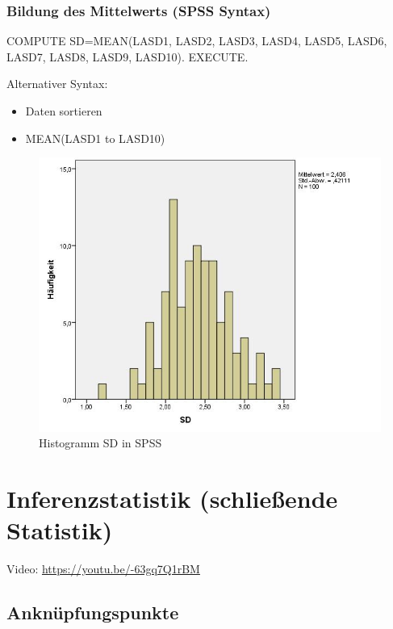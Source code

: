 \documentclass[
]{book}
\providecommand{\tightlist}{%
  \setlength{\itemsep}{0pt}\setlength{\parskip}{0pt}}
\begin{document}
\hypertarget{bildung-des-mittelwerts-spss-syntax}{%
\subsection{Bildung des Mittelwerts (SPSS Syntax)}\label{bildung-des-mittelwerts-spss-syntax}}

COMPUTE SD=MEAN(LASD1, LASD2, LASD3, LASD4, LASD5, LASD6, LASD7, LASD8, LASD9, LASD10).
EXECUTE.

Alternativer Syntax:

\begin{itemize}
\tightlist
\item
  Daten sortieren
\item
  MEAN(LASD1 to LASD10)
\end{itemize}

\begin{figure}
\centering
\includegraphics{pics/SPSS_SD_hist.jpg}
\caption{Histogramm SD in SPSS}
\end{figure}

\hypertarget{inferenzstatistik-schlieuxdfende-statistik}{%
\chapter{Inferenzstatistik (schließende Statistik)}\label{inferenzstatistik-schlieuxdfende-statistik}}

Video: \url{https://youtu.be/-63gq7Q1rBM}

\hypertarget{anknuxfcpfungspunkte-2}{%
\section{Anknüpfungspunkte}\label{anknuxfcpfungspunkte-2}}
\end{document}
